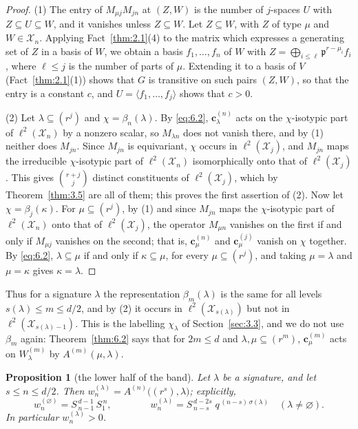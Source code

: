 \documentclass[11pt]{article}
\numberwithin{equation}{section}
\theoremstyle{plain}
\newtheorem{proposition}[theorem]{Proposition}
\theoremstyle{definition}
\begin{document}
\begin{proof}
(1) The entry of $M_{\mu j} M_{jn}$ at $(Z,W)$ is the number of $j$-spaces $U$ with
$Z\subseteq U\subseteq W$, and it vanishes unless $Z\subseteq W$. Let $Z\subseteq W$,
with $Z$ of type $\mu$ and $W\in \mathcal{X}_n$. Applying Fact~\ref{thm:2.1}(4) to the matrix which
expresses a generating set of $Z$ in a basis of $W$, we obtain a basis $f_1,\dots,f_n$
of $W$ with $Z=\bigoplus_{i\le\ell}\mathfrak{p}^{r-\mu_i}f_i$, where $\ell\le j$
is the number of parts of $\mu$. Extending it to a basis of $V$
(Fact~\ref{thm:2.1}(1)) shows that $G$ is transitive on such pairs $(Z,W)$, so that the
entry is a constant $c$, and $U=\langle f_1,\dots,f_j\rangle$ shows that $c>0$.

(2) Let $\lambda\subseteq(r^j)$ and $\chi=\beta_n(\lambda)$. By \eqref{eq:6.2},
$\mathbf c^{(n)}_\lambda$ acts on the $\chi$-isotypic part of $\ell^2(\mathcal{X}_n)$ by a
nonzero scalar, so $M_{\lambda n}$ does not vanish there, and by (1) neither does
$M_{jn}$. Since $M_{jn}$ is equivariant, $\chi$ occurs in $\ell^2(\mathcal{X}_j)$, and
$M_{jn}$ maps the irreducible $\chi$-isotypic part of $\ell^2(\mathcal{X}_n)$ isomorphically
onto that of $\ell^2(\mathcal{X}_j)$. This gives $\binom{r+j}{j}$
distinct constituents of $\ell^2(\mathcal{X}_j)$, which by Theorem~\ref{thm:3.5} are all of them;
this proves the first assertion of (2). Now let $\chi=\beta_j(\kappa)$. For
$\mu\subseteq(r^j)$, by (1) and since $M_{jn}$ maps the $\chi$-isotypic part of
$\ell^2(\mathcal{X}_n)$ onto that of $\ell^2(\mathcal{X}_j)$, the operator $M_{\mu n}$
vanishes on the first if and only if $M_{\mu j}$ vanishes on the second; that is,
$\mathbf c^{(n)}_\mu$ and $\mathbf c^{(j)}_\mu$ vanish on $\chi$ together. By \eqref{eq:6.2}, $\lambda\subseteq\mu$ if and only if
$\kappa\subseteq\mu$, for every $\mu\subseteq(r^j)$, and taking $\mu=\lambda$ and
$\mu=\kappa$ gives $\kappa=\lambda$.
\end{proof}

Thus for a signature $\lambda$ the representation $\beta_m(\lambda)$ is the same for all
levels $s(\lambda)\le m\le d/2$, and by (2) it occurs in $\ell^2(\mathcal{X}_{s(\lambda)})$ but not
in $\ell^2(\mathcal{X}_{s(\lambda)-1})$. This is the labelling $\chi_\lambda$ of Section~\ref{sec:3.3},
and we do not use $\beta_m$ again: Theorem~\ref{thm:6.2} says that for $2m\le d$ and
$\lambda,\mu\subseteq(r^m)$, $\mathbf c^{(m)}_\mu$ acts on $W^{(m)}_\lambda$ by
$A^{(m)}(\mu,\lambda)$.

\begin{proposition}[the lower half of the band]\label{thm:6.4}
Let $\lambda$ be a signature, and let $s\le n\le d/2$. Then
$w^{(\lambda)}_n=A^{(n)}\bigl((r^{s}),\lambda\bigr)$; explicitly,
\[
w^{(\varnothing)}_n=S^{\,d-1}_{\,n-1}\,S^{\,n}_{1},
\qquad\qquad
w^{(\lambda)}_n=S^{\,d-2s}_{\,n-s}\;q^{\,(n-s)\,\sigma(\lambda)}\quad(\lambda\ne\varnothing).
\]
In particular $w^{(\lambda)}_n>0$.
\end{proposition}
\end{document}
